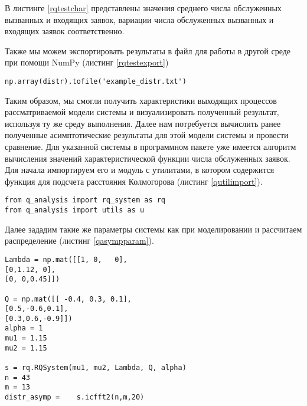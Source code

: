 В листинге \ref{rqtestchar} представлены значения среднего числа обслуженных вызванных и входящих заявок, вариации числа обслуженных вызванных и входящих заявок соответственно.

Также мы можем экспортировать результаты в файл для работы в другой среде при помощи NumPy (листинг \ref{rqtestexport})
\begin{lstlisting}
np.array(distr).tofile('example_distr.txt')
\end{lstlisting}

Таким образом, мы смогли получить характеристики выходящих процессов рассматриваемой модели системы и визуализировать полученный результат, используя ту же среду выполнения. Далее нам потребуется вычислить ранее полученные асимптотические результаты для этой модели системы и провести сравнение. Для указанной системы в программном пакете уже имеется алгоритм вычисления значений характеристической функции числа обслуженных заявок. Для начала импортируем его и модуль с утилитами, в котором содержится функция для подсчета расстояния Колмогорова (листинг \ref{qutilimport}).

\begin{lstlisting}
from q_analysis import rq_system as rq
from q_analysis import utils as u
\end{lstlisting}


Далее зададим такие же параметры системы как при моделировании и рассчитаем распределение (листинг \ref{qasympparam}).
\begin{lstlisting}
Lambda = np.mat([[1, 0,   0],
[0,1.12, 0],
[0, 0,0.45]])

Q = np.mat([[ -0.4, 0.3, 0.1],
[0.5,-0.6,0.1],
[0.3,0.6,-0.9]])
alpha = 1
mu1 = 1.15
mu2 = 1.15

s = rq.RQSystem(mu1, mu2, Lambda, Q, alpha)
n = 43
m = 13
distr_asymp =    s.icfft2(n,m,20)
\end{lstlisting}


